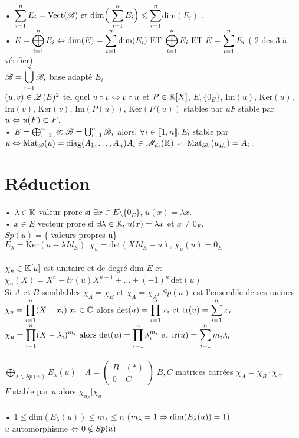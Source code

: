 \documentclass[12 pt]{exampleclass}
\begin{document}
• $\displaystyle{\sum_{i=1}^nE_i = \text{Vect}(\mathscr{B}) \text{ et dim} \Big(\, \sum_{i=1}^nE_i \Big) \leqslant \sum_{i=1}^n}$dim$(E_i)$ .\\
• $\displaystyle{ E = \bigoplus_{i=1}^n E_i \Leftrightarrow\text{dim}(E) = \sum_{i=1}^n\text{dim}(E_i) \text{ ET }  \bigoplus_{i=1}^n E_i\text{ ET }E = \sum_{i=1}^nE_i }$
( 2 des 3 à vérifier)\\
$\displaystyle{\mathscr{B}= \bigcup_{i=1}^n \mathscr{B}_i}$ base adapté $E_i$\\
$ (u,v) \in \mathscr{L}(E)^2$ tel quel $u\circ v \Leftrightarrow v\circ u$ et $P\in\mathbb{K}[X]$, $E, \{0_E\}$, Im$(u)$, Ker$(u)$, Im$(v)$, Ker$(v)$, Im$(P(u))$, Ker$(P(u))$ stables par $u$\quad $F$ stable par $u \Leftrightarrow u(F)\subset F$.\\
• $ E = \bigoplus_{i=1}^n \text{ et } \mathscr{B} = \bigcup_{i=1}^n \mathscr{B}_i$ alors, $\forall i \in \llbracket 1,n \rrbracket, E_i$ stable par $u \Leftrightarrow \text{Mat}_{\mathscr{B}} (u) =\text{diag}(A_1,\dots,A_n)\\ A_i\in \mathscr{M}_{d_i}(\mathbb{K})$ et $\text{Mat}_{\mathscr{B}_i}(u_{E_i}) = A_i$\,.\\
\section{Réduction}

• $\lambda\in \mathbb{K}$ valeur prore si $\exists x\in E\setminus \{0_E\}, \, u(x) = \lambda x$.\\
• $x \in E$ vecteur prore si $\exists \lambda \in \mathbb{K}, \, u(x) = \lambda x$ et $x\neq 0_E$.\\
$Sp(u) =\{$ valeurs propres u\} \ $E_\lambda = \text{Ker}(u - \lambda Id_E) \ \ \chi_u = \text{det}(XId_E - u), \, \chi_u(u) = 0_E$\\
\text{}\\
$\chi_u \in \mathbb{K}[u]$ est unitaire et de degré dim $E$ et $\chi_u(X) = X^n - tr(u)X^{n-1} + \dots + (-1)^n \,$det$(u)$\\
Si $A$ et $B$ semblables $\chi_A = \chi_B$ et $\chi_A = \chi_{A^T} \ Sp(u)$ est l'ensemble de ses racines\\
$\displaystyle{\chi_u = \prod_{i=1}^n(X - x_i)} \; x_i\in \mathbb{C}$ alors det$\displaystyle{(u) = \prod_{i=1}^nx_i}\text{ et } \text{tr}(u) = \sum_{i=1}^n x_i$\\ 
$\displaystyle{ \chi_u = \prod_{i=1}^n(X-\lambda_i)^{m_i} \text{ alors det}(u) = \prod_{i=1}^n\lambda_i^{m_i} \text{ et tr}(u) = \sum_{i=1}^nm_i \lambda_i}$\\
\text{}\\
$\displaystyle{\bigoplus_{\lambda \in Sp(u)} E_\lambda(u)} \quad A = \begin{pmatrix} B & (*) \\ 0 & C \end{pmatrix} \; B,C$ matrices carrées $\chi_A = \chi_B \cdot \chi_C$\\
$F$ stable par $u$ alors $\chi_{u_F} | \chi_u$\\
\text{}\\
• $1 \leqslant \text{dim}(E_\lambda(u)) \leqslant m_\lambda \leqslant n$ \; ($m_\lambda = 1 \Rightarrow \text{dim}(E_\lambda(u)) =1)$\\
$u$ automorphisme $\Leftrightarrow 0 \notin Sp(u)$\\
\end{document}
